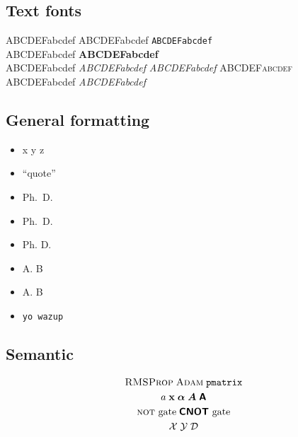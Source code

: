\documentclass[a4paper,11pt]{article}
\begin{document}
  \subsection*{Text fonts}
    \noindent
    \textrm{ABCDEFabcdef}  %
    \textsf{ABCDEFabcdef}  %
    \texttt{ABCDEFabcdef}  %
    \\[0.5em]
    \textmd{ABCDEFabcdef}  %
    \textbf{ABCDEFabcdef}  %
    \\[0.5em]
    \textup{ABCDEFabcdef}  %
    \textit{ABCDEFabcdef}  %
    \textsl{ABCDEFabcdef}  %
    \textsc{ABCDEFabcdef}  %
    \\[0.5em]
    \textnormal{ABCDEFabcdef}  %
    \emph{ABCDEFabcdef}    %

  \subsection*{General formatting}
    \begin{itemize}[noitemsep]
      \item x  y  z 
      \item ``quote''
      \item Ph.~D.
      \item Ph.\ D.
      \item Ph. D.
      \item A. B
      \item A\@. B
      \item \verb*+yo wazup+
    \end{itemize}

  \subsection*{Semantic}
  \begin{gather}
    \textsc{RMSProp} \; \textsc{Adam} \; \texttt{pmatrix} \\
    a \; \mathbf{x} \; \boldsymbol{\alpha} \; \boldsymbol{A} \; \boldsymbol{\mathsf{A}} \\
    \textsc{not}\text{ gate} \; \boldsymbol{\mathsf{CNOT}}\text{ gate} \\
    \mathcal{X} \; \mathcal{Y} \; \mathcal{D}
  \end{gather}

  \newpage

  \setlength{}
  \renewcommand{\bibname}{Bibliography}
  
\end{document}
